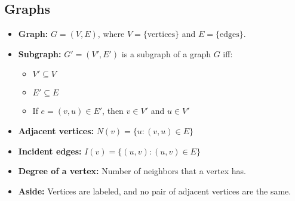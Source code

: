 \subsection{Graphs}
    \begin{definition}
        \begin{itemize}
            \item \textbf{Graph:} $G = (V, E)$, where $V = \{\text{vertices}\}$ and $E = \{\text{edges}\}$.
            \item \textbf{Subgraph:} $G' = (V', E')$ is a subgraph of a graph $G$ iff:
            \begin{itemize}
                \item $V' \subseteq V$
                \item $E' \subseteq E$
                \item If $e = (v, u) \in E'$, then $v \in V'$ and $u \in V'$
            \end{itemize}
            \item \textbf{Adjacent vertices:} $N(v) = \{u : (v, u) \in E\}$
            \item \textbf{Incident edges:} $I(v) = \{(u, v) : (u, v) \in E\}$
            \item \textbf{Degree of a vertex:} Number of neighbors that a vertex has.
            \item \textbf{Aside:} Vertices are labeled, and no pair of adjacent vertices are the same.
        \end{itemize}            
    \end{definition}
